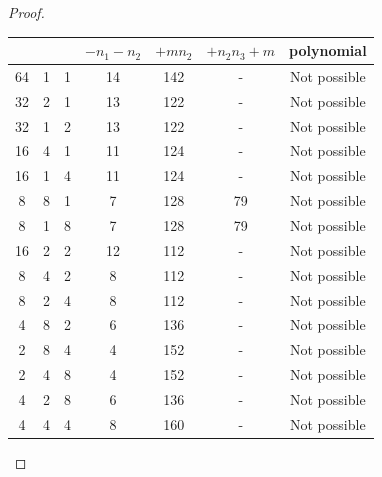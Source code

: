 \documentclass[12pt,a4paper]{article}
\theoremstyle{plain}
\numberwithin{equation}{section}
\begin{document}
\begin{proof}
\begin{enumerate}
\begin{table}[h!]
\begin{tabular}{|c|c|c|c|c|c|c|}
          &      &       &  $-n_1 -n_2$  & $+ mn_2$   & $+ n_2n_3 + m$   & polynomial \\
      \hline
       64 & 1 & 1 & 14 & 142 & - & Not possible\\ \hline
       32 & 2 & 1 & 13  & 122 & - &  Not possible\\ \hline
       32 & 1 & 2 & 13 & 122 & - &  Not possible\\ \hline
       16 & 4 & 1 & 11 & 124 & - &  Not possible\\ \hline
       16 & 1 & 4 & 11  & 124 & - &  Not possible\\ \hline
       8 & 8 & 1 & 7 & 128 & 79 &  Not possible\\ \hline
       8 & 1 & 8 & 7 & 128 & 79 &  Not possible\\ \hline
       16 & 2 & 2 & 12 & 112 & - &  Not possible\\ \hline
       8 & 4 & 2 & 8  & 112 & - &  Not possible\\ \hline
       8 & 2 & 4 & 8  & 112 & - &  Not possible\\ \hline
       4 & 8 & 2 & 6  & 136 & - &  Not possible\\ \hline
       2 & 8 & 4 & 4  & 152 & - &  Not possible\\ \hline
       2 & 4 & 8 & 4 & 152 & - &  Not possible\\ \hline
       4 & 2 & 8 & 6 & 136 & - &  Not possible\\ \hline
       4 & 4 & 4 & 8 & 160 & - &  Not possible\\ \hline
    \end{tabular}
    \label{3components-k=4}
\end{table}



\end{enumerate}
\end{proof}
\end{document}
